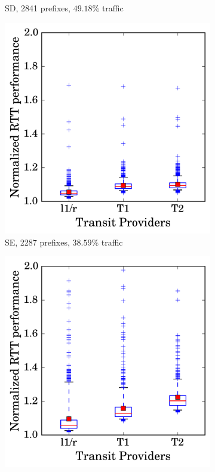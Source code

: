 \begin{figure}
\begin{subfigure}[b]{0.48\textwidth}
                \caption{SD, 2841 prefixes, $49.18\%$ traffic}
                \label{fig:np_sd}
        \end{subfigure}
        \begin{subfigure}[b]{0.48\textwidth}
                \includegraphics[width=\textwidth]{gfx/chap2/np_box_se.png}
                \caption{SE, 2287 prefixes, $38.59\%$ traffic}
                \label{fig:np_se}
        \end{subfigure}
        \begin{subfigure}[b]{0.48\textwidth}
                \includegraphics[width=\textwidth]{gfx/chap2/np_box_sf.png}

\end{subfigure}
\end{figure}
